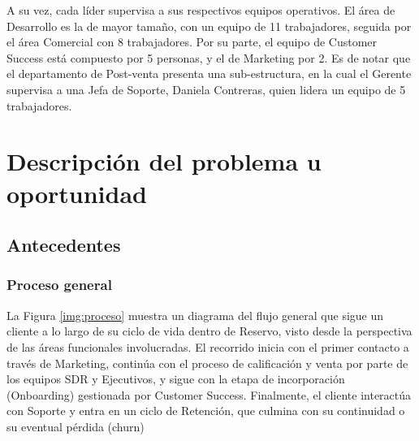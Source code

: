 A su vez, cada líder supervisa a sus respectivos equipos operativos. El área de Desarrollo es la de mayor tamaño, con un equipo de 11 trabajadores, seguida por el área Comercial con 8 trabajadores. Por su parte, el equipo de Customer Success está compuesto por 5 personas, y el de Marketing por 2. Es de notar que el departamento de Post-venta presenta una sub-estructura, en la cual el Gerente supervisa a una Jefa de Soporte, Daniela Contreras, quien lidera un equipo de 5 trabajadores.



\section{Descripción del problema u oportunidad}

\subsection{Antecedentes}


\subsubsection{Proceso general}
La Figura \ref{img:proceso} muestra un diagrama del flujo general que sigue un cliente a lo largo de su ciclo de vida dentro de Reservo, visto desde la perspectiva de las áreas funcionales involucradas. El recorrido inicia con el primer contacto a través de Marketing, continúa con el proceso de calificación y venta por parte de los equipos SDR y Ejecutivos, y sigue con la etapa de incorporación (Onboarding) gestionada por Customer Success. Finalmente, el cliente interactúa con Soporte y entra en un ciclo de Retención, que culmina con su continuidad o su eventual pérdida (churn)



